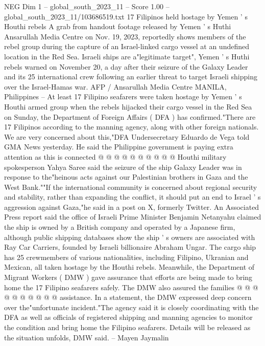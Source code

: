 \begin{textsample}{NEG Dim 1 – global\_south\_2023\_11 – Score 1.00 – global\_south\_2023\_11/103686519.txt}  \label{ex:f1_neg_323}
17 Filipinos held hostage by Yemen ' s Houthi rebels A grab from handout footage released by Yemen ' s Huthi Ansarullah Media Centre on Nov. 19, 2023, reportedly shows members of the rebel group during the capture of an Israel-linked cargo vessel at an undefined location in the Red Sea.
Israeli ships are a"legitimate target", Yemen ' s Huthi rebels warned on November 20, a day after their seizure of the Galaxy Leader and its 25 international crew following an earlier threat to target Israeli shipping over the Israel-Hamas war.
AFP / Ansarullah Media Centre MANILA, Philippines -- At least 17 Filipino seafarers were taken hostage by Yemen ' s Houthi armed group when the rebels hijacked their cargo vessel in the Red Sea on Sunday, the Department of Foreign Affairs ( DFA ) has confirmed."There are 17 Filipinos according to the manning agency, along with other foreign nationals.
We are very concerned about this,"DFA Undersecretary Eduardo de Vega told GMA News yesterday.
He said the Philippine government is paying extra attention as this is connected @ @ @ @ @ @ @ @ @ @ Houthi military spokesperson Yahya Saree said the seizure of the ship Galaxy Leader was in response to the"heinous acts against our Palestinian brothers in Gaza and the West Bank.""If the international community is concerned about regional security and stability, rather than expanding the conflict, it should put an end to Israel ' s aggression against Gaza,"he said in a post on X, formerly Twitter.
An Associated Press report said the office of Israeli Prime Minister Benjamin Netanyahu claimed the ship is owned by a British company and operated by a Japanese firm, although public shipping databases show the ship ' s owners are associated with Ray Car Carriers, founded by Israeli billionaire Abraham Ungar.
The cargo ship has 25 crewmembers of various nationalities, including Filipino, Ukranian and Mexican, all taken hostage by the Houthi rebels.
Meanwhile, the Department of Migrant Workers ( DMW ) gave assurance that efforts are being made to bring home the 17 Filipino seafarers safely.
The DMW also assured the families @ @ @ @ @ @ @ @ @ @ assistance.
In a statement, the DMW expressed deep concern over the"unfortunate incident."The agency said it is closely coordinating with the DFA as well as officials of registered shipping and manning agencies to monitor the condition and bring home the Filipino seafarers.
Details will be released as the situation unfolds, DMW said. -- Mayen Jaymalin

\end{textsample}
